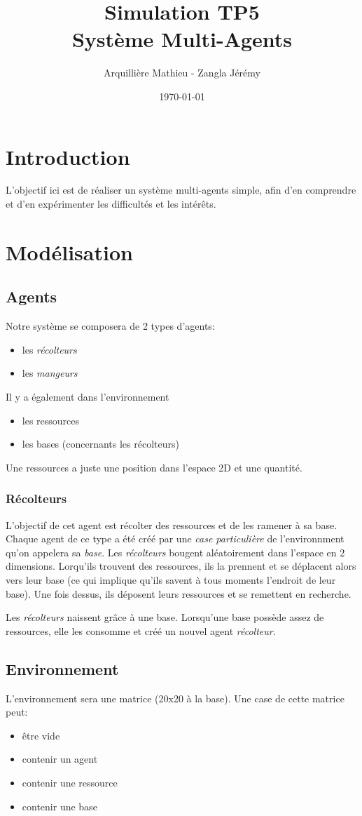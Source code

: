\documentclass{article}
\title{Simulation TP5\\Système Multi-Agents}
\author{Arquillière Mathieu - Zangla Jérémy}
\date{\today}
\begin{document}
\begin{titlepage}
  \maketitle
\end{titlepage}

\tableofcontents
\newpage
\listoffigures
\newpage

\section{Introduction}
L'objectif ici est de réaliser un système multi-agents simple, afin d'en
comprendre et d'en expérimenter les difficultés et les intérêts.

\section{Modélisation}
\subsection{Agents}
Notre système se composera de 2 types d'agents:
\begin{itemize}
  \item les \emph{récolteurs}
  \item les \emph{mangeurs}
\end{itemize}
Il y a également dans l'environnement
\begin{itemize}
  \item les ressources
  \item les bases (concernants les récolteurs)
\end{itemize}
Une ressources a juste une position dans l'espace 2D et une quantité.

\subsubsection{Récolteurs}
L'objectif de cet agent est récolter des ressources et de les ramener à sa base. Chaque
agent de ce type a été créé par une \emph{case particulière} de l'environnment qu'on
appelera sa \emph{base}. Les \emph{récolteurs} bougent aléatoirement dans l'espace
en 2 dimensions. Lorqu'ils trouvent des ressources, ils la prennent et se déplacent alors
vers leur base (ce qui implique qu'ils savent à tous moments l'endroit de leur base).
Une fois dessus, ils déposent leurs ressources et se remettent en recherche.

Les \emph{récolteurs} naissent grâce à une base. Lorsqu'une base possède assez de ressources,
elle les consomme et créé un nouvel agent \emph{récolteur}.

\subsection{Environnement}
L'environnement sera une matrice (20x20 à la base). Une case de cette matrice peut:
\begin{itemize}
  \item être vide
  \item contenir un agent
  \item contenir une ressource
  \item contenir une base
\end{itemize}
\end{document}
